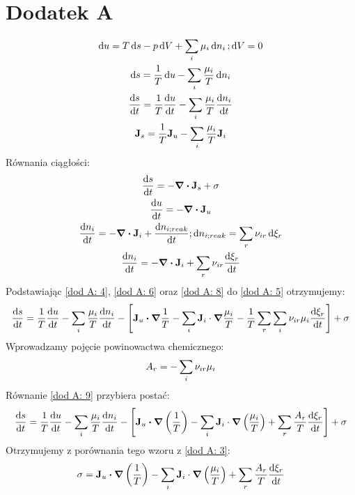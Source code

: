 \documentclass[10pt, a4paper, twoside, onecolumn]{article}
\numberwithin{equation}{section}
\begin{document}
	\section*{Dodatek A}
	\begin{gather}
		\dd{u}=T\dd{s}-p\dd{V}+\sum_{i}\mu_{i}\dd{n_{i}}; \dd{V}=0 \label{dod A: 1} \\
		\dd{s}=\frac{1}{T}\dd{u}-\sum_{i}\frac{\mu_{i}}{T}\dd{n_{i}} \label{dod A: 2} \\
		\dv{s}{t}=\frac{1}{T}\dv{u}{t}-\sum_{i}\frac{\mu_{i}}{T}\dv{n_{i}}{t} \label{dod A: 3} \\
		\vb{J}_{s}=\frac{1}{T}\vb{J}_{u}-\sum_{i}\frac{\mu_{i}}{T}\vb{J}_{i} \label{dod A: 4}
	\end{gather}
	Równania ciągłości:
	\begin{gather}
		\dv{s}{t}=-\div{\vb{J}_{s}}+\sigma \label{dod A: 5} \\
		\dv{u}{t}=-\div{\vb{J}_{u}} \label{dod A: 6} \\
		\dv{n_{i}}{t}=-\div{\vb{J}_{i}}+\dv{n_{i;reak}}{t}; \dd{n_{i;reak}}=\sum_{r}\nu_{ir}\dd{\xi_{r}} \label{dod A: 7} \\
		\dv{n_{i}}{t}=-\div{\vb{J}_{i}}+\sum_{r}\nu_{ir}\dv{\xi_{r}}{t} \label{dod A: 8}
	\end{gather}
	Podstawiając \eqref{dod A: 4}, \eqref{dod A: 6} oraz \eqref{dod A: 8} do \eqref{dod A: 5} otrzymujemy: 
	\begin{equation} \label{dod A: 9}
		\dv{s}{t}=\frac{1}{T}\dv{u}{t}-\sum_{i}\frac{\mu_{i}}{T}\dv{n_{i}}{t}-\left[\vb{J}_{u}\vdot\grad{\frac{1}{T}}-\sum_{i}\vb{J}_{i}\cdot\grad{\frac{\mu_{i}}{T}}-\frac{1}{T}\sum_{r}\sum_{i}\nu_{ir}\mu_{i}\dv{\xi_{r}}{t}\right]+\sigma
	\end{equation}
	Wprowadzamy pojęcie powinowactwa chemicznego: 
	\begin{equation}
		A_{r}=-\sum_{i}\nu_{ir}\mu_{i} \\
	\end{equation}
	Równanie \eqref{dod A: 9} przybiera postać:
	\begin{equation}
		\dv{s}{t}=\frac{1}{T}\dv{u}{t}-\sum_{i}\frac{\mu_{i}}{T}\dv{n_{i}}{t}-\left[\vb{J}_{u}\vdot\grad{\left(\frac{1}{T}\right)}-\sum_{i}\vb{J}_{i}\cdot\grad{\left(\frac{\mu_{i}}{T}\right)}+\sum_{r}\frac{A_{r}}{T}\dv{\xi_{r}}{t}\right]+\sigma
	\end{equation}
	Otrzymujemy z porównania tego wzoru z \eqref{dod A: 3}:
	\begin{equation}
		\sigma=\vb{J}_{u}\vdot\grad{\left(\frac{1}{T}\right)}-\sum_{i}\vb{J}_{i}\cdot\grad{\left(\frac{\mu_{i}}{T}\right)}+\sum_{r}\frac{A_{r}}{T}\dv{\xi_{r}}{t}
	\end{equation}
\end{document}
